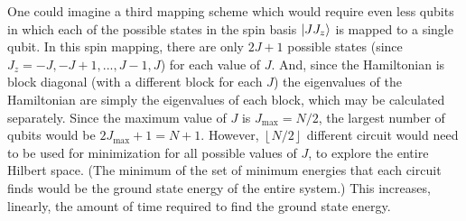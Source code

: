 \documentclass[Dual]{msu-thesis}
\begin{document}
One could imagine a third mapping scheme which would require even less qubits in which each of the possible states in the spin basis $\ket{JJ_z}$ is mapped to a single qubit. In this spin mapping, there are only $2J+1$ possible states (since $J_z=-J,-J+1,...,J-1,J$) for each value of $J$. And, since the Hamiltonian is block diagonal (with a different block for each $J$) the eigenvalues of the Hamiltonian are simply the eigenvalues of each block, which may be calculated separately. Since the maximum value of $J$ is $J_{\text{max}}=N/2$, the largest number of qubits would be $2J_{\text{max}}+1=N+1$. However, $\left\lfloor N/2 \right\rfloor$ different circuit would need to be used for minimization for all possible values of $J$, to explore the entire Hilbert space. (The minimum of the set of minimum energies that each circuit finds would be the ground state energy of the entire system.) This increases, linearly, the amount of time required to find the ground state energy.
\end{document}
